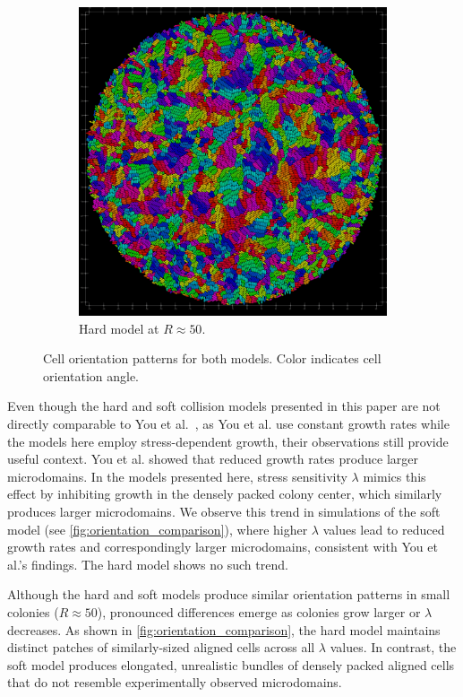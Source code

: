 \documentclass[conference]{IEEEtran}
\begin{document}
\begin{figure}[H]
\begin{subfigure}[b]{0.49\columnwidth}
        \includegraphics[width=\linewidth]{figures/orientation_comparisons/r50_hard_e-2.jpeg}
        \caption{Hard model at $R \approx 50$.}
    \end{subfigure}
    \caption{Cell orientation patterns for both models. Color indicates cell orientation angle.}
    \label{fig:orientation_comparison_small}
\end{figure}

Even though the hard and soft collision models presented in this paper are not directly comparable to You et al.~\cite{You2018}, as You et al. use constant growth rates while the models here employ stress-dependent growth, their observations still provide useful context. You et al. showed that reduced growth rates produce larger microdomains. In the models presented here, stress sensitivity $\lambda$ mimics this effect by inhibiting growth in the densely packed colony center, which similarly produces larger microdomains. We observe this trend in simulations of the soft model (see \autoref{fig:orientation_comparison}), where higher $\lambda$ values lead to reduced growth rates and correspondingly larger microdomains, consistent with You et al.'s findings. The hard model shows no such trend.

Although the hard and soft models produce similar orientation patterns in small colonies ($R \approx 50$), pronounced differences emerge as colonies grow larger or $\lambda$ decreases. As shown in \autoref{fig:orientation_comparison}, the hard model maintains distinct patches of similarly-sized aligned cells across all $\lambda$ values. In contrast, the soft model produces elongated, unrealistic bundles of densely packed aligned cells that do not resemble experimentally observed microdomains.
\end{document}
